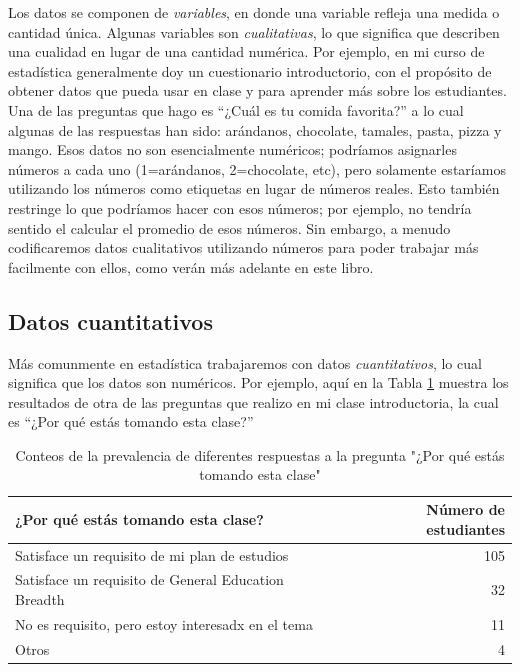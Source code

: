 \documentclass[
  12pt,
]{book}
\begin{document}
Los datos se componen de \emph{variables}, en donde una variable refleja una medida o cantidad única. Algunas variables son \emph{cualitativas}, lo que significa que describen una cualidad en lugar de una cantidad numérica. Por ejemplo, en mi curso de estadística generalmente doy un cuestionario introductorio, con el propósito de obtener datos que pueda usar en clase y para aprender más sobre los estudiantes. Una de las preguntas que hago es ``¿Cuál es tu comida favorita?'' a lo cual algunas de las respuestas han sido: arándanos, chocolate, tamales, pasta, pizza y mango. Esos datos no son esencialmente numéricos; podríamos asignarles números a cada uno (1=arándanos, 2=chocolate, etc), pero solamente estaríamos utilizando los números como etiquetas en lugar de números reales. Esto también restringe lo que podríamos hacer con esos números; por ejemplo, no tendría sentido el calcular el promedio de esos números. Sin embargo, a menudo codificaremos datos cualitativos utilizando números para poder trabajar más facilmente con ellos, como verán más adelante en este libro.

\hypertarget{datos-cuantitativos}{%
\subsection{Datos cuantitativos}\label{datos-cuantitativos}}

Más comunmente en estadística trabajaremos con datos \emph{cuantitativos}, lo cual significa que los datos son numéricos. Por ejemplo, aquí en la Tabla \ref{tab:WhyTakingClass} muestra los resultados de otra de las preguntas que realizo en mi clase introductoria, la cual es ``¿Por qué estás tomando esta clase?''

\begin{table}

\caption{\label{tab:WhyTakingClass}Conteos de la prevalencia de diferentes respuestas a la pregunta "¿Por qué estás tomando esta clase"}
\centering
\begin{tabular}[t]{lr}
\toprule
¿Por qué estás tomando esta clase? & Número de estudiantes\\
\midrule
Satisface un requisito de mi plan de estudios & 105\\
Satisface un requisito de General Education Breadth & 32\\
No es requisito, pero estoy interesadx en el tema & 11\\
Otros & 4\\
\bottomrule
\end{tabular}
\end{table}
\end{document}
